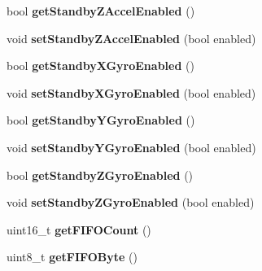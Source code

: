 \begin{DoxyCompactItemize}
\item 
\hypertarget{class_m_p_u6050_adae85612e047c4c7f0c3b7110fc92956}{bool {\bfseries get\+Standby\+Z\+Accel\+Enabled} ()}\label{class_m_p_u6050_adae85612e047c4c7f0c3b7110fc92956}

\item 
\hypertarget{class_m_p_u6050_ac5fd917549d2ed0f12b8a17167271199}{void {\bfseries set\+Standby\+Z\+Accel\+Enabled} (bool enabled)}\label{class_m_p_u6050_ac5fd917549d2ed0f12b8a17167271199}

\item 
\hypertarget{class_m_p_u6050_acb5fde4167aa54fbbe84706d577a48a6}{bool {\bfseries get\+Standby\+X\+Gyro\+Enabled} ()}\label{class_m_p_u6050_acb5fde4167aa54fbbe84706d577a48a6}

\item 
\hypertarget{class_m_p_u6050_ac1c6d8f623a9ca00a4ddc50f6615b977}{void {\bfseries set\+Standby\+X\+Gyro\+Enabled} (bool enabled)}\label{class_m_p_u6050_ac1c6d8f623a9ca00a4ddc50f6615b977}

\item 
\hypertarget{class_m_p_u6050_aaad2985f8d22aec123f1e1dabcdd427a}{bool {\bfseries get\+Standby\+Y\+Gyro\+Enabled} ()}\label{class_m_p_u6050_aaad2985f8d22aec123f1e1dabcdd427a}

\item 
\hypertarget{class_m_p_u6050_ab0973d64b7132188539b07991f7ea1f0}{void {\bfseries set\+Standby\+Y\+Gyro\+Enabled} (bool enabled)}\label{class_m_p_u6050_ab0973d64b7132188539b07991f7ea1f0}

\item 
\hypertarget{class_m_p_u6050_a20f7804db1a980a3c425ae44c33d420b}{bool {\bfseries get\+Standby\+Z\+Gyro\+Enabled} ()}\label{class_m_p_u6050_a20f7804db1a980a3c425ae44c33d420b}

\item 
\hypertarget{class_m_p_u6050_ada7c8a873fe157703dcdc08e25b48e32}{void {\bfseries set\+Standby\+Z\+Gyro\+Enabled} (bool enabled)}\label{class_m_p_u6050_ada7c8a873fe157703dcdc08e25b48e32}

\item 
\hypertarget{class_m_p_u6050_ad96c7a75a39327ebaae01386bcbc58dd}{uint16\+\_\+t {\bfseries get\+F\+I\+F\+O\+Count} ()}\label{class_m_p_u6050_ad96c7a75a39327ebaae01386bcbc58dd}

\item 
\hypertarget{class_m_p_u6050_a7733011d30d5b64564f6b5422d8639ae}{uint8\+\_\+t {\bfseries get\+F\+I\+F\+O\+Byte} ()}\label{class_m_p_u6050_a7733011d30d5b64564f6b5422d8639ae}


\end{DoxyCompactItemize}

